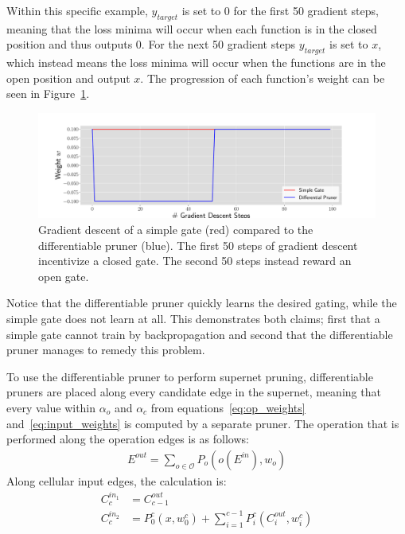 Within this specific example, $y_{target}$ is set to 0 for the first 50 gradient steps, meaning that the loss minima will occur when each function is in the
closed position and thus outputs $0$. For the next 50 gradient steps $y_{target}$ is set to $x$, which instead means the loss
minima will occur when the functions are in the open position and output $x$. The progression of each function's weight
can be seen in Figure~\ref{fig:gatevspruner}.


\begin{figure}[ht]
	\centering
	\includegraphics[width=\textwidth]{gate_vs_gateandsaw}
	\caption[Gradient descents of simple gates versus differentiable pruners]{Gradient descent of a simple gate (red) compared to the differentiable pruner (blue).
	The first 50 steps
	of gradient descent incentivize a closed gate. The second 50 steps instead reward an open gate.}
	\label{fig:gatevspruner}
\end{figure}

Notice that the differentiable pruner quickly learns the desired gating, while the simple gate does not learn at all. This
demonstrates both claims; first that a simple gate cannot train by backpropagation and second that the differentiable
pruner manages to remedy this problem.

To use the differentiable pruner to perform supernet pruning, differentiable pruners are placed along every
candidate edge in the supernet, meaning that every value within
$\alpha_o$ and $\alpha_c$ from equations~\ref{eq:op_weights} and~\ref{eq:input_weights} is computed by a separate
pruner. The operation that is performed along the operation edges is as follows:
\begin{align}
	E^{out} = \sum_{o \in \mathcal{O}} P_o (o(E^{in}), w_o)
\end{align}
Along cellular input edges, the calculation is:
\begin{align}
	C^{in_1}_c &= C^{out}_{c-1} \\
	C^{in_2}_c &= P^c_0(x, w^c_0) + \sum_{i=1}^{c-1}{P^c_i(C^{out}_{i}, w^c_i)}
\end{align}

